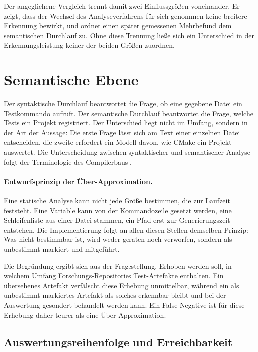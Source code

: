 \documentclass[12pt,a4paper,twoside,headsepline,parskip=half]{scrreprt}
\begin{document}
Der angeglichene Vergleich trennt damit zwei Einflussgrößen voneinander. Er zeigt,
dass der Wechsel des Analyseverfahrens für sich genommen keine breitere Erkennung
bewirkt, und ordnet einen später gemessenen Mehrbefund dem semantischen Durchlauf zu.
Ohne diese Trennung ließe sich ein Unterschied in der Erkennungsleistung keiner der
beiden Größen zuordnen.

\section{Semantische Ebene}
\label{sec:impl-semantisch}

Der syntaktische Durchlauf beantwortet die Frage, ob eine gegebene Datei ein
Testkommando aufruft. Der semantische Durchlauf beantwortet die Frage, welche Tests
ein Projekt registriert. Der Unterschied liegt nicht im Umfang, sondern in der Art der
Aussage: Die erste Frage lässt sich am Text einer einzelnen Datei entscheiden, die
zweite erfordert ein Modell davon, wie CMake ein Projekt auswertet. Die Unterscheidung
zwischen syntaktischer und semantischer Analyse folgt der Terminologie des
Compilerbaus \cite{Aho_Lam_Sethi_Ullman_2007}.

\paragraph{Entwurfsprinzip der Über-Approximation.}
Eine statische Analyse kann nicht jede Größe bestimmen, die zur Laufzeit feststeht.
Eine Variable kann von der Kommandozeile gesetzt werden, eine Schleifenliste aus einer
Datei stammen, ein Pfad erst zur Generierungszeit entstehen. Die Implementierung folgt
an allen diesen Stellen demselben Prinzip: Was nicht bestimmbar ist, wird weder geraten
noch verworfen, sondern als unbestimmt markiert und mitgeführt.

Die Begründung ergibt sich aus der Fragestellung. Erhoben werden soll, in welchem
Umfang Forschungs-Repositories Test-Artefakte enthalten. Ein übersehenes Artefakt
verfälscht diese Erhebung unmittelbar, während ein als unbestimmt markiertes Artefakt
als solches erkennbar bleibt und bei der Auswertung gesondert behandelt werden kann.
Ein False Negative ist für diese Erhebung daher teurer als eine Über-Approximation.

\subsection{Auswertungsreihenfolge und Erreichbarkeit}
\label{sec:impl-erreichbarkeit}
\end{document}
